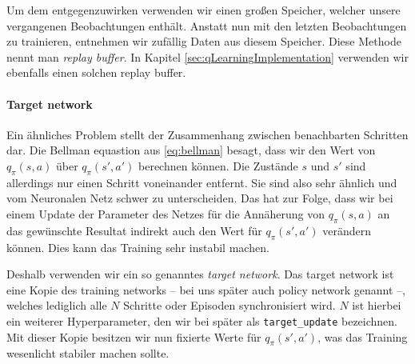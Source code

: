 Um dem entgegenzuwirken verwenden wir einen großen Speicher, welcher unsere vergangenen Beobachtungen enthält. Anstatt nun mit den letzten Beobachtungen zu trainieren, entnehmen wir zufällig Daten aus diesem Speicher. Diese Methode nennt man \textit{replay buffer}. In Kapitel \ref{sec:qLearningImplementation} verwenden wir ebenfalls einen solchen replay buffer.

\paragraph{Target network}
Ein ähnliches Problem stellt der Zusammenhang zwischen benachbarten Schritten dar. Die Bellman equastion aus \ref{eq:bellman} besagt, dass wir den Wert von $ q_\pi(s, a) $ über $ q_\pi(s', a') $ berechnen können. Die Zustände $ s $ und $ s' $ sind allerdings nur einen Schritt voneinander entfernt. Sie sind also sehr ähnlich und vom Neuronalen Netz schwer zu unterscheiden. Das hat zur Folge, dass wir bei einem Update der Parameter des Netzes für die Annäherung von $ q_\pi(s, a) $ an das gewünschte Resultat indirekt auch den Wert für $ q_\pi(s', a') $ verändern können. Dies kann das Training sehr instabil machen.

Deshalb verwenden wir ein so genanntes \textit{target network}. Das target network ist eine Kopie des training networks -- bei uns später auch policy network genannt --, welches lediglich alle $ N $ Schritte oder Episoden synchronisiert wird. $ N $ ist hierbei ein weiterer Hyperparameter, den wir bei später als \texttt{target_update} bezeichnen. Mit dieser Kopie besitzen wir nun fixierte Werte für $ q_\pi(s', a') $, was das Training wesenlicht stabiler machen sollte.

